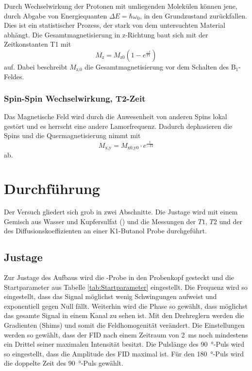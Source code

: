 Durch Wechselwirkung der Protonen mit umliegenden Molekülen können jene, durch Abgabe von Energiequanten $\Delta E = \hbar \omega_0$, in den Grundzustand zurückfallen.
Dies ist ein statistischer Prozess, der stark von dem untersuchten Material abhängt.
Die Gesamtmagnetisierung in z-Richtung baut sich mit der Zeitkonstanten T1 mit
\begin{equation}
  M_\text{z} = M_\text{z0} (1-e^{\frac{-t}{T1}})
  \label{eqn:T1Zeit}
\end{equation}
auf. Dabei beschreibt $M_\text{z,0}$ die Gesamtmagnetisierung vor dem Schalten des B$_1$-Feldes.

\subsubsection{Spin-Spin Wechselwirkung, T2-Zeit}

Das Magnetische Feld wird durch die Anwesenheit von anderen Spins lokal gestört und es herrscht eine andere Lamorfrequenz.
Dadurch dephasieren die Spins und die Quermagnetisierung nimmt mit
\begin{equation}
  M_\text{x,y} = M_\text{x0,y0} \cdot e^{\frac{t}{-T2}}
  \label{eqn:T2Zeit}
\end{equation}
ab.

















\section{Durchführung}
Der Versuch gliedert sich grob in zwei Abschnitte. Die Justage wird mit einem Gemisch aus Wasser und Kupfersulfat () und die Messungen der $T1$, $T2$ und der des Diffusionskoeffizienten an einer K1-Butanol Probe durchgeführt.

\subsection{Justage}
Zur Justage des Aufbaus wird die -Probe in den Probenkopf gesteckt und die Startparameter aus Tabelle \ref{tab:Startparameter} eingestellt.
Die Frequenz wird so eingestellt, dass das Signal möglichst wenig Schwingungen aufweist und exponentiell gegen Null fällt.
Weiterhin wird die Phase so gewählt, dass möglichst das gesamte Signal in einem Kanal zu sehen ist.
Mit den Drehreglern werden die Gradienten (Shims) und somit die Feldhomogenität verändert. Die Einstellungen werden so gewählt, dass der FID nach einem Zeitraum von \SI{2}{\milli\second} noch mindestens ein Drittel seiner maximalen Intensität besitzt.
Die Pulslänge des \SI{90}{\degree}-Puls wird so eingestellt, dass die Amplitude des FID maximal ist. Für den \SI{180}{\degree}-Puls wird die doppelte Zeit des \SI{90}{\degree}-Puls gewählt.

